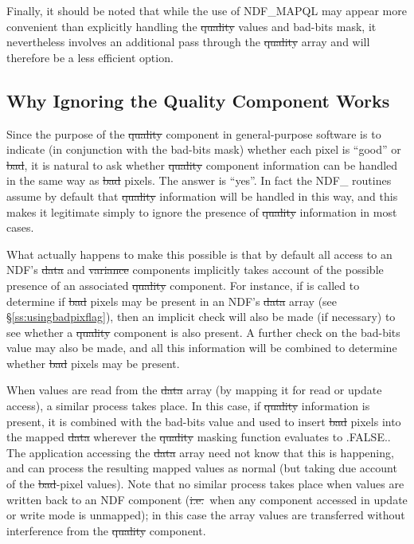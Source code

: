 Finally, it should be noted that while the use of NDF\_MAPQL may appear more
convenient than explicitly handling the \st{quality\/} values and bad-bits
mask, it nevertheless involves an additional pass through the \st{quality\/}
array and will therefore be a less efficient option. 

\subsection{Why Ignoring the Quality Component Works}

Since the purpose of the \st{quality\/} component in general-purpose software is
to indicate (in conjunction with the bad-bits mask) whether each pixel is
``good'' or \st{bad}, it is natural to ask whether \st{quality\/} component 
information can be handled in the same way as \st{bad\/} pixels.
The answer is ``yes''.
In fact the NDF\_ routines assume by default that \st{quality\/} information
will be handled in this way, and this makes it legitimate simply to ignore
the presence of \st{quality\/} information in most cases. 

What actually happens to make this possible is that by default all access to
an NDF's \st{data\/} and \st{variance\/} components implicitly takes account
of the possible  presence of an associated \st{quality\/} component. 
For instance, if  is called to determine if \st{bad\/} pixels may be
present in an NDF's \st{data\/} array (see \S\ref{ss:usingbadpixflag}), then an
implicit check will also be made (if necessary) to see whether a \st{quality\/}
component is also present. 
A further check on the bad-bits value may also be made, and all this
information will be combined to determine whether \st{bad\/} pixels may be
present. 

When values are read from the \st{data\/} array (by mapping it for read or update 
access), a similar process takes place.
In this case, if \st{quality\/} information is present, it is combined with the 
bad-bits value and used to insert \st{bad\/} pixels into the mapped \st{data\/}
wherever the \st{quality\/} masking function evaluates to .FALSE..
The application accessing the \st{data\/} array need not know that this is
happening, and can process the resulting mapped values as normal (but taking
due account of the \st{bad\/}-pixel values). 
Note that no similar process takes place when values are written back to an
NDF component (\st{i.e.}\ when any component accessed in update or write
mode is unmapped); in this case the array values are transferred without
interference from the \st{quality\/} component.

